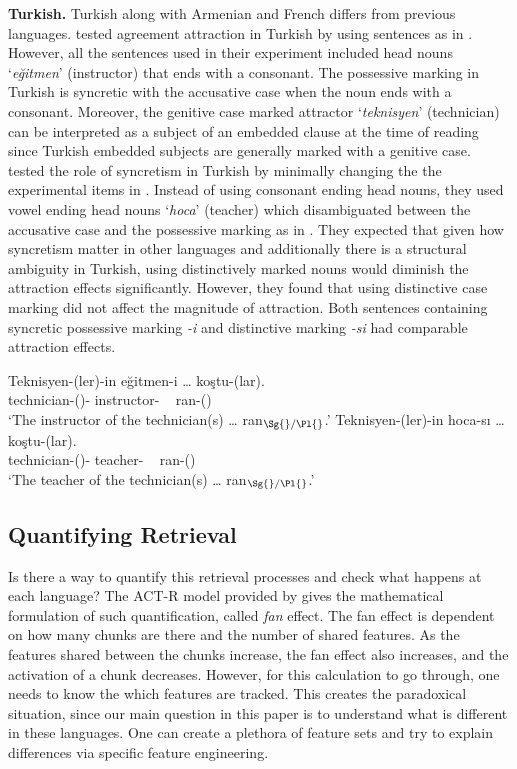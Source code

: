 \documentclass[10pt,letterpaper]{article}
\begin{document}
\textbf{Turkish.} Turkish along with Armenian and French differs from previous languages.  tested agreement attraction in Turkish by using sentences as in . However, all the sentences used in their experiment included head nouns `\textit{e\u{g}itmen}' (instructor) that ends with a consonant. The possessive marking in Turkish is syncretic with the accusative case when the noun ends with a consonant. Moreover, the genitive case marked attractor `\textit{teknisyen}' (technician) can be interpreted as a subject of an embedded clause at the time of reading since Turkish embedded subjects are generally marked with a genitive case.  tested the role of syncretism in Turkish by minimally changing the the experimental items in . Instead of using consonant ending head nouns, they used vowel ending head nouns `\textit{hoca}' (teacher) which disambiguated between the accusative case and the possessive marking as in . They expected that given how syncretism matter in other languages and additionally there is a structural ambiguity in Turkish, using distinctively marked nouns would diminish the attraction effects significantly. However, they found that using distinctive case marking did not affect the magnitude of attraction. Both sentences containing syncretic possessive marking \textit{-i} and distinctive marking \textit{-si} had comparable attraction effects.

\ea \label{lago} 
\gll Teknisyen-(ler)-in e\u{g}itmen-i \ldots{} ko\c{s}tu-(lar).\\
technician-(\Pl{})-\Gen{} instructor-\Poss{} ~ ran-(\Pl{})\\
\glt `The instructor of the technician(s) \ldots{} ran$_{\Sg{}/\Pl{}}$.'
\ex \label{turk} 
\gll Teknisyen-(ler)-in hoca-s{\i} \ldots{} ko\c{s}tu-(lar).\\
technician-(\Pl{})-\Gen{} teacher-\Poss{} ~ ran-(\Pl{})\\
\glt `The teacher of the technician(s) \ldots{} ran$_{\Sg{}/\Pl{}}$.'
\z

\subsection{Quantifying Retrieval}

Is there a way to quantify this retrieval processes and check what happens at each language? The ACT-R model provided by  gives the mathematical formulation of such quantification, called \textit{fan} effect. The fan effect is dependent on how many chunks are there and the number of shared features. As the features shared between the chunks increase, the fan effect also increases, and the activation of a chunk decreases. However, for this calculation to go through, one needs to know the which features are tracked. This creates the paradoxical situation, since our main question in this paper is to understand what is different in these languages. One can create a plethora of feature sets and try to explain differences via specific feature engineering. 
\end{document}
